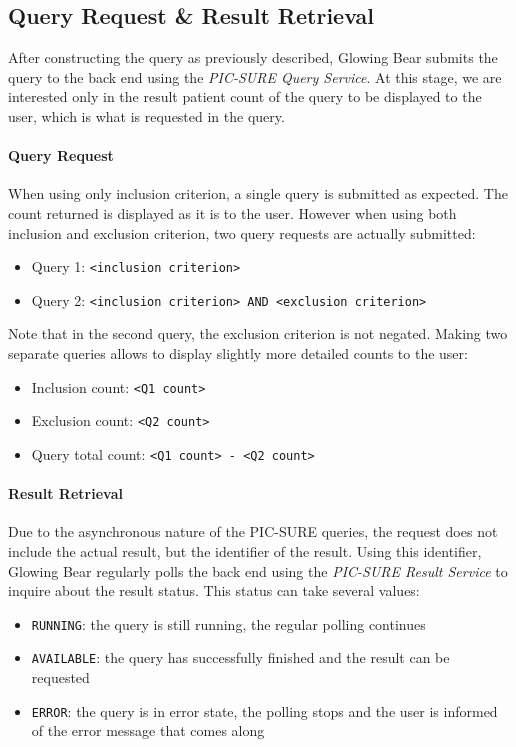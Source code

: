 \subsection{Query Request & Result Retrieval}
\label{sec:interoplayer-gb-results}

After constructing the query as previously described, Glowing Bear submits the query to the back end using the \emph{PIC-SURE Query Service}.
At this stage, we are interested only in the result patient count of the query to be displayed to the user, which is what is requested in the query.

\paragraph{Query Request}
When using only inclusion criterion, a single query is submitted as expected. 
The count returned is displayed as it is to the user.
However when using both inclusion and exclusion criterion, two query requests are actually submitted:
\begin{itemize}
    \setlength\itemsep{0em}

    \item Query 1: \verb|<inclusion criterion>|
    \item Query 2: \verb|<inclusion criterion> AND <exclusion criterion>|
\end{itemize}

Note that in the second query, the exclusion criterion is not negated.
Making two separate queries allows to display slightly more detailed counts to the user:
\begin{itemize}
    \setlength\itemsep{0em}

    \item Inclusion count: \verb|<Q1 count>|
    \item Exclusion count: \verb|<Q2 count>|
    \item Query total count: \verb|<Q1 count> - <Q2 count>|
\end{itemize}


\paragraph{Result Retrieval}
Due to the asynchronous nature of the PIC-SURE queries, the request does not include the actual result, but the identifier of the result.
Using this identifier, Glowing Bear regularly polls the back end using the \emph{PIC-SURE Result Service} to inquire about the result status.
This status can take several values:
\begin{itemize}
    \setlength\itemsep{0em}

    \item \verb|RUNNING|: the query is still running, the regular polling continues
    \item \verb|AVAILABLE|: the query has successfully finished and the result can be requested
    \item \verb|ERROR|: the query is in error state, the polling stops and the user is informed of the error message that comes along
\end{itemize}

